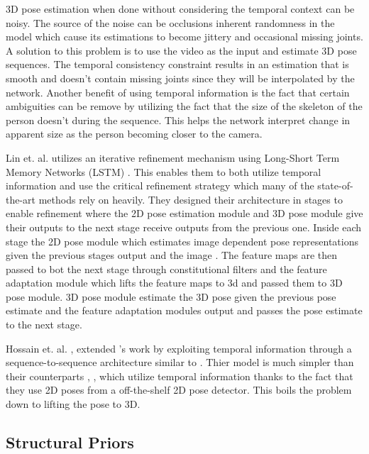 3D pose estimation when done without considering the temporal context can be noisy. The source of the noise can be occlusions inherent randomness in the model which cause its estimations to become jittery and occasional missing joints. A solution to this problem is to use the video as the input and estimate 3D pose sequences. The temporal consistency constraint results in an estimation that is smooth and doesn't contain missing joints since they will be interpolated by the network. Another benefit of using temporal information is the fact that certain ambiguities can be remove by utilizing the fact that the size of the skeleton of the person doesn't during the sequence. This helps the network interpret change in apparent size as the person becoming closer to the camera.

Lin et. al. \parencite{lin2017recurrent} utilizes an iterative refinement mechanism using Long-Short Term Memory Networks (LSTM) \parencite{hochreiter1997long}. This enables them to both utilize temporal information and use the critical refinement strategy which many of the state-of-the-art methods rely on heavily. They designed their architecture in stages to enable refinement where the 2D pose estimation module and 3D pose module give their outputs to the next stage receive outputs from the previous one. Inside each stage the 2D pose module which estimates image dependent pose representations given the previous stages output and the image . The feature maps are then passed to bot the next stage through constitutional filters and the feature adaptation module which lifts the feature maps to 3d and passed them to 3D pose module. 3D pose module estimate the 3D pose given the previous pose estimate and the feature adaptation modules output and passes the pose estimate to the next stage.

Hossain et. al. \parencite{hossain2017exploiting}, \parencite{hossain2017understanding} extended \parencite{martinez2017simple}'s work by exploiting temporal information through a sequence-to-sequence architecture similar to \parencite{sutskever2014sequence}. Thier model is much simpler than their counterparts \parencite{lin2017recurrent}, \parencite{bogo2016keep}, \parencite{mehta2017vnect} which utilize temporal information thanks to the fact that they use 2D poses from a off-the-shelf 2D pose detector. This boils the problem down to lifting the pose to 3D.

\subsection{Structural Priors}


